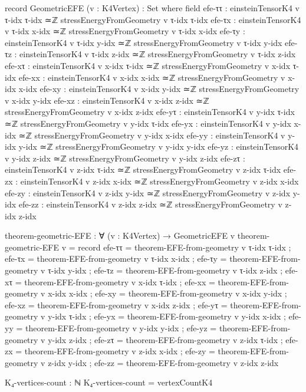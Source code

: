 \documentclass[11pt,a4paper]{book}
\begin{document}
\begin{code}
record GeometricEFE (v : K4Vertex) : Set where
  field
    efe-ττ : einsteinTensorK4 v τ-idx τ-idx ≃ℤ stressEnergyFromGeometry v τ-idx τ-idx
    efe-τx : einsteinTensorK4 v τ-idx x-idx ≃ℤ stressEnergyFromGeometry v τ-idx x-idx
    efe-τy : einsteinTensorK4 v τ-idx y-idx ≃ℤ stressEnergyFromGeometry v τ-idx y-idx
    efe-τz : einsteinTensorK4 v τ-idx z-idx ≃ℤ stressEnergyFromGeometry v τ-idx z-idx
    efe-xτ : einsteinTensorK4 v x-idx τ-idx ≃ℤ stressEnergyFromGeometry v x-idx τ-idx
    efe-xx : einsteinTensorK4 v x-idx x-idx ≃ℤ stressEnergyFromGeometry v x-idx x-idx
    efe-xy : einsteinTensorK4 v x-idx y-idx ≃ℤ stressEnergyFromGeometry v x-idx y-idx
    efe-xz : einsteinTensorK4 v x-idx z-idx ≃ℤ stressEnergyFromGeometry v x-idx z-idx
    efe-yτ : einsteinTensorK4 v y-idx τ-idx ≃ℤ stressEnergyFromGeometry v y-idx τ-idx
    efe-yx : einsteinTensorK4 v y-idx x-idx ≃ℤ stressEnergyFromGeometry v y-idx x-idx
    efe-yy : einsteinTensorK4 v y-idx y-idx ≃ℤ stressEnergyFromGeometry v y-idx y-idx
    efe-yz : einsteinTensorK4 v y-idx z-idx ≃ℤ stressEnergyFromGeometry v y-idx z-idx
    efe-zτ : einsteinTensorK4 v z-idx τ-idx ≃ℤ stressEnergyFromGeometry v z-idx τ-idx
    efe-zx : einsteinTensorK4 v z-idx x-idx ≃ℤ stressEnergyFromGeometry v z-idx x-idx
    efe-zy : einsteinTensorK4 v z-idx y-idx ≃ℤ stressEnergyFromGeometry v z-idx y-idx
    efe-zz : einsteinTensorK4 v z-idx z-idx ≃ℤ stressEnergyFromGeometry v z-idx z-idx

theorem-geometric-EFE : ∀ (v : K4Vertex) → GeometricEFE v
theorem-geometric-EFE v = record
  { efe-ττ = theorem-EFE-from-geometry v τ-idx τ-idx
  ; efe-τx = theorem-EFE-from-geometry v τ-idx x-idx
  ; efe-τy = theorem-EFE-from-geometry v τ-idx y-idx
  ; efe-τz = theorem-EFE-from-geometry v τ-idx z-idx
  ; efe-xτ = theorem-EFE-from-geometry v x-idx τ-idx
  ; efe-xx = theorem-EFE-from-geometry v x-idx x-idx
  ; efe-xy = theorem-EFE-from-geometry v x-idx y-idx
  ; efe-xz = theorem-EFE-from-geometry v x-idx z-idx
  ; efe-yτ = theorem-EFE-from-geometry v y-idx τ-idx
  ; efe-yx = theorem-EFE-from-geometry v y-idx x-idx
  ; efe-yy = theorem-EFE-from-geometry v y-idx y-idx
  ; efe-yz = theorem-EFE-from-geometry v y-idx z-idx
  ; efe-zτ = theorem-EFE-from-geometry v z-idx τ-idx
  ; efe-zx = theorem-EFE-from-geometry v z-idx x-idx
  ; efe-zy = theorem-EFE-from-geometry v z-idx y-idx
  ; efe-zz = theorem-EFE-from-geometry v z-idx z-idx
  }







K₄-vertices-count : ℕ
K₄-vertices-count = vertexCountK4


\end{code}
\end{document}
